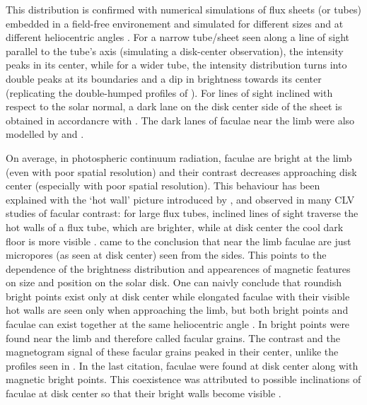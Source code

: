 \documentclass[goettingen, gauss, print]{thesis}
\begin{document}
This distribution is confirmed with numerical simulations of flux sheets (or tubes) embedded in a field-free environement and simulated for different sizes and at different heliocentric angles \citep{steiner_recent_2005}. For a narrow tube/sheet seen along a line of sight parallel to the tube's axis (simulating a disk-center observation), the intensity peaks in its center, while for a wider tube, the intensity distribution turns into double peaks at its boundaries and a dip in brightness towards its center (replicating the double-humped profiles of \cite{berger_solar_2004}).
For lines of sight inclined with respect to the solar normal, a dark lane on the disk center side of the sheet is obtained in accordancre with \cite{hirzberger_solar_2005}. The dark lanes of faculae near the limb were also modelled by \cite{keller_origin_2004} and \cite{carlsson_observational_2004}.

On average, in photospheric continuum radiation, faculae are bright at the limb (even with poor spatial resolution) and their contrast decreases approaching disk center (especially with poor spatial resolution). This behaviour has been explained with the `hot wall' picture introduced by \citep{spruit_pressure_1976}, and observed in many CLV studies of facular contrast: for large flux tubes, inclined lines of sight traverse the hot walls of a flux tube, which are brighter, while at disk center the cool dark floor is more visible \citep[]{topka_properties_1992,topka_properties_1997,ortiz_intensity_2002,kobel_discriminant_2009,yeo_intensity_2013}. 
\cite{topka_properties_1997} came to the conclusion that near the limb faculae are just micropores (as seen at disk center) seen from the sides. This points to the dependence of the brightness distribution and appearences of magnetic features on size and position on the solar disk.
One can naivly conclude that roundish bright points exist only at disk center while elongated faculae with their visible hot walls are seen only when approaching the limb, but both bright points and faculae can exist together at the same heliocentric angle \citep{kobel_discriminant_2009}. In \cite{berger_contrast_2007} bright points were found near the limb and therefore called facular grains. The contrast and the magnetogram signal of these facular grains peaked in their center, unlike the profiles seen in \cite{hirzberger_solar_2005}. In the last citation, faculae were found at disk center along with magnetic bright points. This coexistence was attributed to possible inclinations of faculae at disk center so that their bright walls become visible \citep{keller_origin_2004}.
\end{document}
